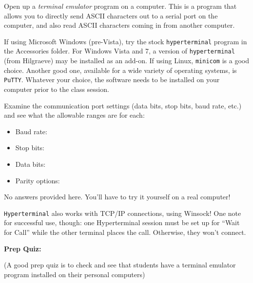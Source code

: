 

Open up a {\it terminal emulator} program on a computer.  This is a program that allows you to directly send ASCII characters out to a serial port on the computer, and also read ASCII characters coming in from another computer.  

If using Microsoft Windows (pre-Vista), try the stock {\tt hyperterminal} program in the Accessories folder.  For Windows Vista and 7, a version of {\tt hyperterminal} (from Hilgraeve) may be installed as an add-on.  If using Linux, {\tt minicom} is a good choice.  Another good one, available for a wide variety of operating systems, is {\tt PuTTY}.  Whatever your choice, the software needs to be installed on your computer prior to the class session.

Examine the communication port settings (data bits, stop bits, baud rate, etc.) and see what the allowable ranges are for each:

\begin{itemize}
\item{} Baud rate:
\vskip 5pt
\item{} Stop bits:
\vskip 5pt
\item{} Data bits:
\vskip 5pt
\item{} Parity options:
\end{itemize}







No answers provided here.  You'll have to try it yourself on a real computer!







{\tt Hyperterminal} also works with TCP/IP connections, using Winsock!  One note for successful use, though: one Hyperterminal session must be set up for ``Wait for Call'' while the other terminal places the call.  Otherwise, they won't connect.



\vfil \eject

\noindent
{\bf Prep Quiz:}

(A good prep quiz is to check and see that students have a terminal emulator program installed on their personal computers)




